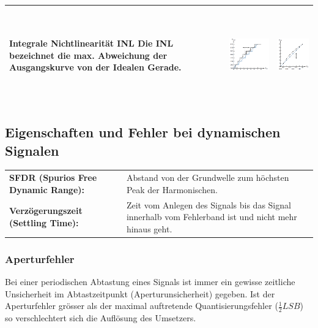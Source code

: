 \begin{tabular}{|p{5.5cm}|c|c|}
	\\ \hline
	\textbf{Integrale Nichtlinearität INL \hartl{439}} \newline \newline
  Die INL bezeichnet die max. Abweichung der Ausgangskurve von der Idealen Gerade.
	& \includegraphics[height=4cm, valign=t]{./pictures/INL_ADC.png}
	& \includegraphics[height=4cm, valign=t]{./pictures/INL_DAC.png}
	\\ \hline
\end{tabular}


\subsection{Eigenschaften und Fehler bei dynamischen Signalen}

\begin{tabular}{l p{11cm}}
  \textbf{SFDR (Spurios Free Dynamic Range):} &
  Abstand von der Grundwelle zum höchsten Peak der Harmonischen. \\
  \textbf{Verzögerungszeit (Settling Time):} &
  Zeit vom Anlegen des Signals bis das Signal innerhalb vom Fehlerband ist und nicht mehr hinaus geht.
\end{tabular}


\subsubsection{Aperturfehler} 
Bei einer periodischen Abtastung eines Signals ist immer ein gewisse zeitliche
Unsicherheit im Abtastzeitpunkt (Aperturunsicherheit) gegeben. Ist der Aperturfehler grösser als der maximal
auftretende Quantisierungsfehler ($\frac{1}{2}LSB$) so verschlechtert sich die Auflösung des Umsetzers. 

